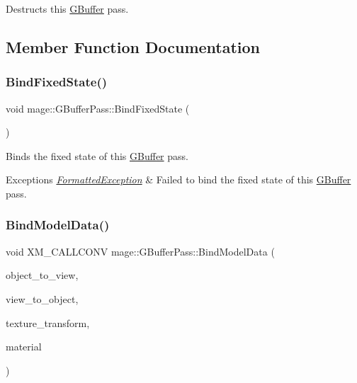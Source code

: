 Destructs this \hyperlink{structmage_1_1_g_buffer}{G\+Buffer} pass. 

\subsection{Member Function Documentation}
\hypertarget{classmage_1_1_g_buffer_pass_a4a13364cc0318417f31df50d7081b0b0}{}\label{classmage_1_1_g_buffer_pass_a4a13364cc0318417f31df50d7081b0b0} 
\subsubsection{\texorpdfstring{Bind\+Fixed\+State()}{BindFixedState()}}
{\footnotesize\ttfamily void mage\+::\+G\+Buffer\+Pass\+::\+Bind\+Fixed\+State (\begin{DoxyParamCaption}{ }\end{DoxyParamCaption})}

Binds the fixed state of this \hyperlink{structmage_1_1_g_buffer}{G\+Buffer} pass.


\begin{DoxyExceptions}{Exceptions}
{\em \hyperlink{structmage_1_1_formatted_exception}{Formatted\+Exception}} & Failed to bind the fixed state of this \hyperlink{structmage_1_1_g_buffer}{G\+Buffer} pass. \\
\hline
\end{DoxyExceptions}
\hypertarget{classmage_1_1_g_buffer_pass_a5296050798e8430601e0f42d1f8327db}{}\label{classmage_1_1_g_buffer_pass_a5296050798e8430601e0f42d1f8327db} 
\subsubsection{\texorpdfstring{Bind\+Model\+Data()}{BindModelData()}}
{\footnotesize\ttfamily void X\+M\+\_\+\+C\+A\+L\+L\+C\+O\+NV mage\+::\+G\+Buffer\+Pass\+::\+Bind\+Model\+Data (\begin{DoxyParamCaption}\item[{F\+X\+M\+M\+A\+T\+R\+IX}]{object\+\_\+to\+\_\+view,  }\item[{C\+X\+M\+M\+A\+T\+R\+IX}]{view\+\_\+to\+\_\+object,  }\item[{C\+X\+M\+M\+A\+T\+R\+IX}]{texture\+\_\+transform,  }\item[{const \hyperlink{structmage_1_1_material}{Material} $\ast$}]{material }\end{DoxyParamCaption})\hspace{0.3cm}{\ttfamily [private]}}

